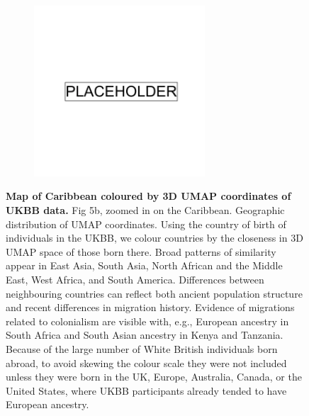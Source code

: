 \begin{figure}
    \centering
    \begin{subfigure}{\textwidth}
    \includegraphics[width=0.7\textwidth]{placeholder.png}
    \end{subfigure}
    \caption[Map of Caribbean coloured by 3D UMAP coordinates of UKBB data]{\textbf{Map of Caribbean coloured by 3D UMAP coordinates of UKBB data.} Fig 5b, zoomed in on the Caribbean. Geographic distribution of UMAP coordinates. Using the country of birth of individuals in the UKBB, we colour countries by the closeness in 3D UMAP space of those born there. Broad patterns of similarity appear in East Asia, South Asia, North African and the Middle East, West Africa, and South America. Differences between neighbouring countries can reflect both ancient population structure and recent differences in migration history. Evidence of migrations related to colonialism are visible with, e.g., European ancestry in South Africa and South Asian ancestry in Kenya and Tanzania. Because of the large number of White British individuals born abroad, to avoid skewing the colour scale they were not included unless they were born in the UK, Europe, Australia, Canada, or the United States, where UKBB participants already tended to have European ancestry.}
    \label{fig:supp_umap_ukbb_car}
\end{figure}

\newpage

